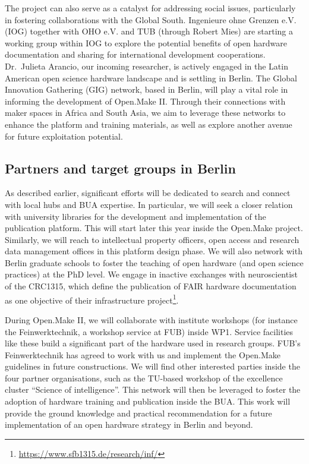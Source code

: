 \documentclass[
  12pt,
  a4paper,
]{article}
\begin{document}
The project can also serve as a catalyst for addressing social issues,
particularly in fostering collaborations with the Global South.
Ingenieure ohne Grenzen e.V. (IOG) together with OHO e.V. and TUB
(through Robert Mies) are starting a working group within IOG to explore
the potential benefits of open hardware documentation and sharing for
international development cooperations. Dr.~Julieta Arancio, our
incoming researcher, is actively engaged in the Latin American open
science hardware landscape and is settling in Berlin. The Global
Innovation Gathering (GIG) network, based in Berlin, will play a vital
role in informing the development of Open.Make II. Through their
connections with maker spaces in Africa and South Asia, we aim to
leverage these networks to enhance the platform and training materials,
as well as explore another avenue for future exploitation potential.

\hypertarget{partners-and-target-groups-in-berlin}{%
\subsection{Partners and target groups in
Berlin}\label{partners-and-target-groups-in-berlin}}

As described earlier, significant efforts will be dedicated to search
and connect with local hubs and BUA expertise. In particular, we will
seek a closer relation with university libraries for the development and
implementation of the publication platform. This will start later this
year inside the Open.Make project. Similarly, we will reach to
intellectual property officers, open access and research data management
offices in this platform design phase. We will also network with Berlin
graduate schools to foster the teaching of open hardware (and open
science practices) at the PhD level. We engage in inactive exchanges
with neuroscientist of the CRC1315, which define the publication of FAIR
hardware documentation as one objective of their infrastructure
project\footnote{\url{https://www.sfb1315.de/research/inf/}}.

During Open.Make II, we will collaborate with institute workshops (for
instance the Feinwerktechnik, a workshop service at FUB) inside WP1.
Service facilities like these build a significant part of the hardware
used in research groups. FUB's Feinwerktechnik has agreed to work with
us and implement the Open.Make guidelines in future constructions. We
will find other interested parties inside the four partner
organisations, such as the TU-based workshop of the excellence cluster
``Science of intelligence''. This network will then be leveraged to
foster the adoption of hardware training and publication inside the BUA.
This work will provide the ground knowledge and practical recommendation
for a future implementation of an open hardware strategy in Berlin and
beyond.
\end{document}

